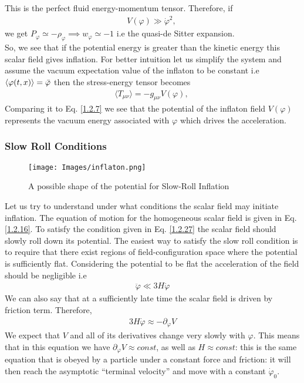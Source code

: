 This is the perfect fluid energy-momentum tensor. Therefore, if 
\begin{align}
    V(\varphi) \gg \dot{\varphi}^2 ,\ \label{1.2.27}
\end{align}
we get $P_{\varphi} \simeq -\rho_{\varphi} \implies w_{\varphi} \simeq -1 $ i.e the quasi-de Sitter expansion.\\
So, we see that if the potential energy is greater than the kinetic energy this scalar field gives inflation. For better intuition let us simplify the system and assume the vacuum expectation value of the inflaton to be constant i.e \(\langle \varphi(t,x) \rangle = \Bar{\varphi}\) then the stress-energy tensor becomes
\begin{align}
    \langle T_{\mu\nu} \rangle  = -g_{\mu\nu} V(\varphi) ,\ \label{1.2.28}
\end{align}
Comparing it to Eq. \eqref{1.2.7} we see that the potential of the inflaton field $V(\varphi)$  represents the vacuum energy associated with $\varphi$ which drives the acceleration.\\

\subsubsection{Slow Roll Conditions}
\begin{figure}[ht]
    \centering
    \texttt{[image: Images/inflaton.png]}
    \caption{A possible shape of the potential for Slow-Roll Inflation \cite{baumann2012tasi}}
    \label{fig:1.2} 
\end{figure}
\hspace{0.5cm} Let us try to understand under what conditions the scalar field may initiate inflation. The equation of motion for the homogeneous scalar field is given in Eq. \eqref{1.2.16}. To satisfy the condition given in Eq. \eqref{1.2.27} the scalar field should slowly roll down its potential. The easiest way to satisfy the slow roll condition is to require that there exist regions of field-configuration space where the potential is sufficiently flat. Considering the potential to be flat the acceleration of the field should be negligible i.e
\begin{align}
    \ddot{\varphi} \ll 3H\dot{\varphi} \label{1.2.29}
\end{align}
We can also say that at a sufficiently late time the scalar field is driven by friction term. Therefore,
\begin{align}
    3H\dot{\varphi} \approx -\partial_{\varphi} V \label{1.2.30}
\end{align}
We expect that $V$ and all of its derivatives change very slowly with $\varphi$.
This means that in this equation we have \(\partial_{\varphi} V \approx const\), as well as \(H \approx const\): this is the same equation that is obeyed by a particle under a constant force and friction: it will then reach the asymptotic ``{terminal velocity}'' and move with a constant \(\dot{\varphi}_0 \).\\ 

